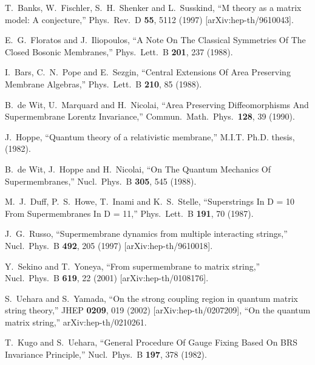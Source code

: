 \documentclass[12pt,a4paper]{article}
\begin{document}
\begin{thebibliography}{99}


 T.~Banks, W.~Fischler, S.~H.~Shenker and L.~Susskind,
	``M theory as a matrix model: A conjecture,''
	Phys.\ Rev.\ D {\bf 55}, 5112 (1997)
	[arXiv:hep-th/9610043].

 E.~G.~Floratos and J.~Iliopoulos,
	``A Note On The Classical Symmetries Of The Closed Bosonic
	Membranes,'' Phys.\ Lett.\ B {\bf 201}, 237 (1988).

 I.~Bars, C.~N.~Pope and E.~Sezgin,
	``Central Extensions Of Area Preserving Membrane Algebras,''
	Phys.\ Lett.\ B {\bf 210}, 85 (1988).

 B.~de Wit, U.~Marquard and H.~Nicolai,
	``Area Preserving Diffeomorphisms And Supermembrane Lorentz
	Invariance,''
	Commun.\ Math.\ Phys.\  {\bf 128}, 39 (1990).

 J.~Hoppe,
	``Quantum theory of a relativistic membrane,''
	M.I.T. Ph.D. thesis, (1982).

 B.~de Wit, J.~Hoppe and H.~Nicolai,
	``On The Quantum Mechanics Of Supermembranes,''
	Nucl.\ Phys.\ B {\bf 305}, 545 (1988).

M.~J.~Duff, P.~S.~Howe, T.~Inami and K.~S.~Stelle,
	``Superstrings In D = 10 From Supermembranes In D = 11,''
	Phys.\ Lett.\ B {\bf 191}, 70 (1987).

J.~G.~Russo,
	``Supermembrane dynamics from multiple interacting strings,''
	Nucl.\ Phys.\ B {\bf 492}, 205 (1997)
	[arXiv:hep-th/9610018].

Y.~Sekino and T.~Yoneya,
	``From supermembrane to matrix string,''
	Nucl.\ Phys.\ B {\bf 619}, 22 (2001)
	[arXiv:hep-th/0108176].

 S.~Uehara and S.~Yamada,
	``On the strong coupling region in quantum matrix string
	theory,''
	JHEP {\bf 0209}, 019 (2002) [arXiv:hep-th/0207209],
	``On the quantum matrix string,'' arXiv:hep-th/0210261.

 T.~Kugo and S.~Uehara,
	``General Procedure Of Gauge Fixing Based On BRS Invariance
	Principle,''
	Nucl.\ Phys.\ B {\bf 197}, 378 (1982).


\end{thebibliography}
\end{document}
